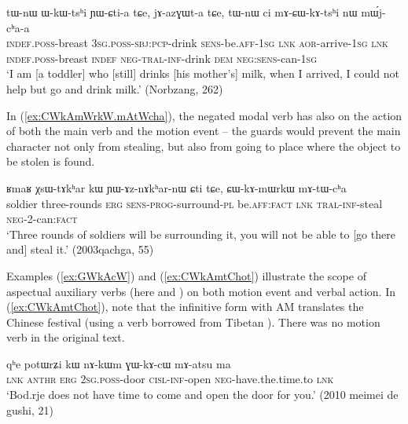 \begin{exe}
\ex \label{ex:mACWkAtshi}
\gll  tɯ-nɯ ɯ-kɯ-tsʰi ɲɯ-ɕti-a tɕe, jɤ-azɣɯt-a tɕe, tɯ-nɯ ci mɤ-ɕɯ-kɤ-tsʰi nɯ mɯ́j-cʰa-a \\
\textsc{indef}.\textsc{poss}-breast \textsc{3sg}.\textsc{poss}-\textsc{sbj}:\textsc{pcp}-drink \textsc{sens}-be.\textsc{aff}-\textsc{1sg} \textsc{lnk} \textsc{aor}-arrive-\textsc{1sg} \textsc{lnk} \textsc{indef}.\textsc{poss}-breast  \textsc{indef} \textsc{neg}-\textsc{tral}-\textsc{inf}-drink \textsc{dem} \textsc{neg}:\textsc{sens}-can-\textsc{1sg} \\
\glt `I am [a toddler] who [still] drinks [his mother's] milk, when I arrived, I could not help but go and drink milk.'  (Norbzang, 262)
 \end{exe}
 
 In (\ref{ex:CWkAmWrkW.mAtWcha}), the negated modal verb has also on the action of both the main verb and the motion event -- the guards would prevent the main character not only from stealing, but also from going to place where the object to be stolen is found. 
 
\begin{exe}
\ex \label{ex:CWkAmWrkW.mAtWcha}
\gll ʁmaʁ χsɯ-tɤkʰar kɯ ɲɯ-ɤz-nɤkʰar-nɯ ɕti tɕe, ɕɯ-kɤ-mɯrkɯ mɤ-tɯ-cʰa  \\
soldier three-rounds \textsc{erg} \textsc{sens}-\textsc{prog}-surround-\textsc{pl} be.\textsc{aff}:\textsc{fact} \textsc{lnk}  \textsc{tral}-\textsc{inf}-steal \textsc{neg}-2-can:\textsc{fact} \\
\glt `Three rounds of soldiers will be surrounding it, you will not be able to [go there and] steal it.' (2003qachga, 55)
   \end{exe}
   
 Examples (\ref{ex:GWkAcW}) and (\ref{ex:CWkAmtChot}) illustrate the scope of aspectual  auxiliary verbs (here   and ) on both motion event and verbal action.  In (\ref{ex:CWkAmtChot}), note that the infinitive form with AM   translates the Chinese festival  (using a verb borrowed from Tibetan  ). There was no motion verb in the original text.
 
\begin{exe}
\ex \label{ex:GWkAcW}
\gll qʰe potɯrʑi kɯ nɤ-kɯm ɣɯ-kɤ-cɯ mɤ-atsu ma \\
\textsc{lnk}  \textsc{anthr} \textsc{erg} \textsc{2sg}.\textsc{poss}-door \textsc{cisl}-\textsc{inf}-open \textsc{neg}-have.the.time.to \textsc{lnk} \\
\glt `Bod.rje does not have time to come and open the door for you.' (2010 meimei de gushi, 21)
\end{exe} 
  
